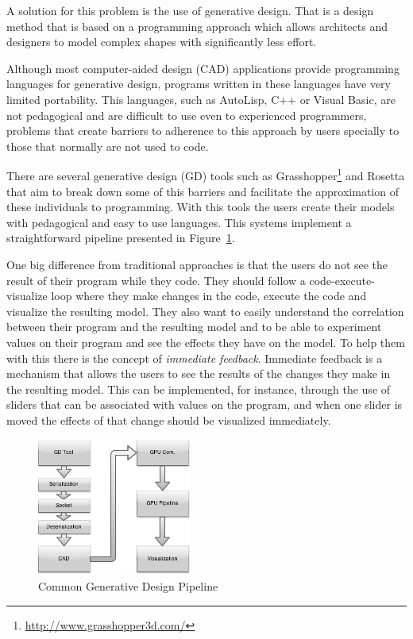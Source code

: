 A solution for this problem is the use of generative design. That is a design method that is based on a programming approach which allows architects and designers to model complex shapes with significantly less effort. 

Although most computer-aided design (CAD) applications provide programming languages for generative design, programs written in these languages have very limited portability. This languages, such as AutoLisp, C++ or Visual Basic, are not pedagogical and are difficult to use even to experienced programmers, problems that create barriers to adherence to this approach by users specially to those that normally are not used to code.\cite{ramos_et_al:OASIcs:2014:4565}

There are several generative design (GD) tools such as Grasshopper\footnote{\url{http://www.grasshopper3d.com/}} and Rosetta that aim to break down some of this barriers and facilitate the approximation of these individuals to programming. With this tools the users create their models with pedagogical and easy to use languages. This systems implement a straightforward pipeline presented in Figure~\ref{fig:GD_Pipeline}. 

One big difference from traditional approaches is that the users do not see the result of their program while they code. They should follow a code-execute-visualize loop where they make changes in the code, execute the code and visualize the resulting model. They also want to easily understand the correlation between their program and the resulting model and to be able to experiment values on their program and see the effects they have on the model. To help them with this there is the concept of \emph{immediate feedback}. Immediate feedback is a mechanism that allows the users to see the results of the changes they make in the resulting model. This can be implemented, for instance, through the use of sliders that can be associated with values on the program, and when one slider is moved the effects of that change should be visualized immediately. 

\begin{figure}[htbp]
	\centering
	\includegraphics[width=0.45\textwidth]{img/Architecture/GD-Common-Pipeline.png}
	\caption{Common Generative Design Pipeline}
	\label{fig:GD_Pipeline}
\end{figure}

